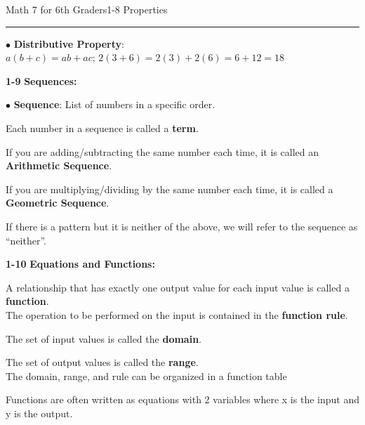 \begin{enumerate*}
\begin{enumerate*}
\noindent\Large{Math 7 for 6th Graders\hfill 1-8 Properties}
\noindent\hrule
\vspace{5mm}

				\item[$\bullet$]\textbf{Distributive Property}:\\
					$a(b+c)=ab+ac$; $2(3+6)=2(3)+2(6)=6+12=18$\\
			\end{enumerate*}

		\item[\Large\textbf{1-9}] \Large\textbf{Sequences:}\\
			\begin{enumerate*}
				\item[$\bullet$]\textbf{Sequence}: List of numbers in a specific order.\\
				\item[]Each number in a sequence is called a \textbf{term}.\\
				\item[]If you are adding/subtracting the same number each time, it is called an \textbf{Arithmetic Sequence}.\\
				\item[]If you are multiplying/dividing by the same number each time, it is called a \textbf{Geometric Sequence}.\\
				\item[]If there is a pattern but it is neither of the above, we will refer to the sequence as ``neither''.\\
			\end{enumerate*}
		\item[\Large\textbf{1-10}] \Large\textbf{Equations and Functions:}\\
			\begin{enumerate*}
				\item[]A relationship that has exactly one output value for each input value is called a \textbf{function}.\\
					The operation to be performed on the input is contained in the \textbf{function rule}.\\
				\item[]The set of input values is called the \textbf{domain}.\\
				\item[]The set of output values is called the \textbf{range}.\\
					The domain, range, and rule can be organized in a function table\\
				\item[]Functions are often written as equations with 2 variables where x is the input and y is the output.\\
			\end{enumerate*}
			

\end{enumerate*}
